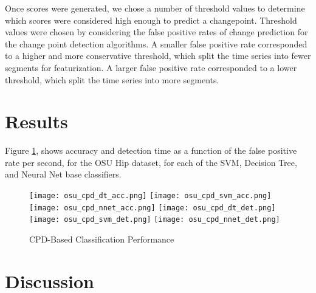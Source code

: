 Once scores were generated, we chose a number of threshold values to determine which
scores were considered high enough to predict a changepoint.
Threshold values were chosen by considering the false positive rates of
change prediction for the change point detection algorithms. A smaller false positive rate
corresponded to a higher and more conservative threshold, which split the
time series into fewer segments for featurization. A larger false positive rate
corresponded to a lower threshold, which split the time series into more segments.

\section{Results}
Figure \ref{fig:cpd_perf}, shows accuracy and detection time as a function of the
false positive rate per second, for the OSU Hip dataset,
for each of the SVM, Decision Tree, and Neural Net base classifiers.

\begin{figure}
 \centering
 \texttt{[image: osu\_cpd\_dt\_acc.png]}
 \texttt{[image: osu\_cpd\_svm\_acc.png]}
 \texttt{[image: osu\_cpd\_nnet\_acc.png]}
 \texttt{[image: osu\_cpd\_dt\_det.png]}
 \texttt{[image: osu\_cpd\_svm\_det.png]}
 \texttt{[image: osu\_cpd\_nnet\_det.png]}
 \caption{CPD-Based Classification Performance}
 \label{fig:cpd_perf}
\end{figure}

\section{Discussion}
